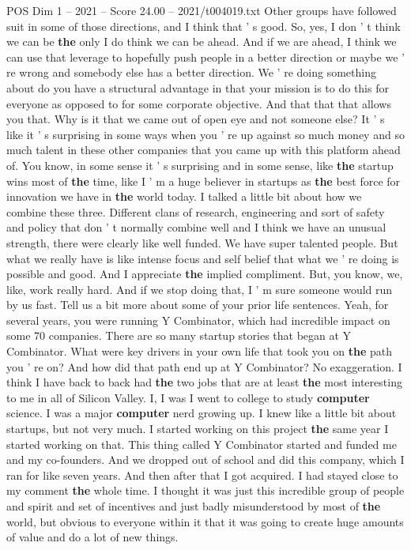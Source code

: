 \begin{textsample}{POS Dim 1 – 2021 – Score 24.00 – 2021/t004019.txt}
Other groups have followed suit in some of those directions, and I think that ' s good.
So, yes, I don ' t think we can be \textbf{the} only I do think we can be ahead.
And if we are ahead, I think we can use that leverage to hopefully push people in a better direction or maybe we ' re wrong and somebody else has a better direction.
We ' re doing something about do you have a structural advantage in that your mission is to do this for everyone as opposed to for some corporate objective.
And that that that allows you that.
Why is it that we came out of open eye and not someone else?
It ' s like it ' s surprising in some ways when you ' re up against so much money and so much talent in these other companies that you came up with this platform ahead of.
You know, in some sense it ' s surprising and in some sense, like \textbf{the} startup wins most of \textbf{the} time, like I ' m a huge believer in startups as \textbf{the} best force for innovation we have in \textbf{the} world today.
I talked a little bit about how we combine these three.
Different clans of research, engineering and sort of safety and policy that don ' t normally combine well and I think we have an unusual strength, there were clearly like well funded.
We have super talented people.
But what we really have is like intense focus and self belief that what we ' re doing is possible and good.
And I appreciate \textbf{the} implied compliment.
But, you know, we, like, work really hard.
And if we stop doing that, I ' m sure someone would run by us fast.
Tell us a bit more about some of your prior life sentences.
Yeah, for several years, you were running Y Combinator, which had incredible impact on some 70 companies.
There are so many startup stories that began at Y Combinator.
What were key drivers in your own life that took you on \textbf{the} path you ' re on?
And how did that path end up at Y Combinator?
No exaggeration.
I think I have back to back had \textbf{the} two jobs that are at least \textbf{the} most interesting to me in all of Silicon Valley.
I, I was I went to college to study \textbf{computer} science.
I was a major \textbf{computer} nerd growing up.
I knew like a little bit about startups, but not very much.
I started working on this project \textbf{the} same year I started working on that.
This thing called Y Combinator started and funded me and my co-founders.
And we dropped out of school and did this company, which I ran for like seven years.
And then after that I got acquired.
I had stayed close to my comment \textbf{the} whole time.
I thought it was just this incredible group of people and spirit and set of incentives and just badly misunderstood by most of \textbf{the} world, but obvious to everyone within it that it was going to create huge amounts of value and do a lot of new things.

\end{textsample}
